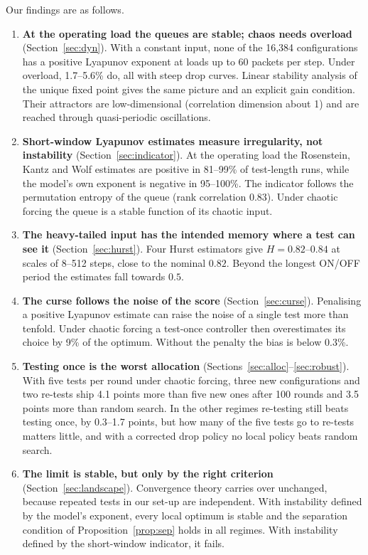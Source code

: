 \documentclass[11pt,a4paper]{article}
\begin{document}
Our findings are as follows.
\begin{enumerate}[leftmargin=*,itemsep=2pt]
\item \textbf{At the operating load the queues are stable; chaos needs overload} (Section~\ref{sec:dyn}). With a constant input, none of the 16,384 configurations has a positive Lyapunov exponent at loads up to 60 packets per step. Under overload, 1.7--5.6\% do, all with steep drop curves. Linear stability analysis of the unique fixed point gives the same picture and an explicit gain condition. Their attractors are low-dimensional (correlation dimension about 1) and are reached through quasi-periodic oscillations.
\item \textbf{Short-window Lyapunov estimates measure irregularity, not instability} (Section~\ref{sec:indicator}). At the operating load the Rosenstein, Kantz and Wolf estimates are positive in 81--99\% of test-length runs, while the model's own exponent is negative in 95--100\%. The indicator follows the permutation entropy of the queue (rank correlation 0.83). Under chaotic forcing the queue is a stable function of its chaotic input.
\item \textbf{The heavy-tailed input has the intended memory where a test can see it} (Section~\ref{sec:hurst}). Four Hurst estimators give $H=0.82$--$0.84$ at scales of 8--512 steps, close to the nominal $0.82$. Beyond the longest ON/OFF period the estimates fall towards $0.5$.
\item \textbf{The curse follows the noise of the score} (Section~\ref{sec:curse}). Penalising a positive Lyapunov estimate can raise the noise of a single test more than tenfold. Under chaotic forcing a test-once controller then overestimates its choice by 9\% of the optimum. Without the penalty the bias is below 0.3\%.
\item \textbf{Testing once is the worst allocation} (Sections~\ref{sec:alloc}--\ref{sec:robust}). With five tests per round under chaotic forcing, three new configurations and two re-tests ship 4.1 points more than five new ones after 100 rounds and 3.5 points more than random search. In the other regimes re-testing still beats testing once, by 0.3--1.7 points, but how many of the five tests go to re-tests matters little, and with a corrected drop policy no local policy beats random search.
\item \textbf{The limit is stable, but only by the right criterion} (Section~\ref{sec:landscape}). Convergence theory carries over unchanged, because repeated tests in our set-up are independent. With instability defined by the model's exponent, every local optimum is stable and the separation condition of Proposition~\ref{prop:sep} holds in all regimes. With instability defined by the short-window indicator, it fails.
\end{enumerate}
\end{document}
